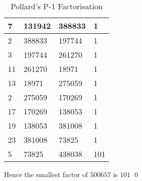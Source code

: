 \documentclass[11pt,a4paper,fleqn]{article}
\begin{document}
\begin{enumerate}[1.]
\begin{flushleft}
\begin{table}[H]
\begin{adjustbox}{scale=1.2,center}
\begin{tabular}{ |l|l|l|l| }
                        7 &    131942 &    388833 &    1\\\hline
                        2 &    388833 &    197744 &    1\\\hline
                        3 &    197744 &    261270 &    1\\\hline
                        11 &    261270 &     18971 &    1\\\hline
                        13 &     18971 &    275059 &    1\\\hline
                        2 &    275059 &    170269 &    1\\\hline
                        17 &    170269 &    138053 &    1\\\hline
                        19 &    138053 &    381008 &    1\\\hline
                        23 &    381008 &     73825 &    1\\\hline
                        5 &     73825 &    438038 &  101\\\hline
                    \end{tabular}
                \end{adjustbox}
                \caption{Pollard's P-1 Factorisation}
                \label{table:pollards-p-1}
            \end{table}
            Hence the smallest factor of $500657$ is $101$ \qed


\end{flushleft}
\end{enumerate}
\end{document}
